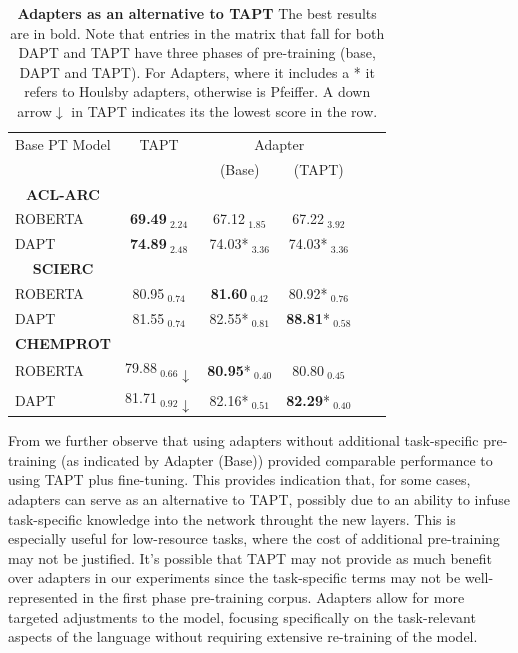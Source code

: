 \documentclass[10pt,twocolumn,letterpaper]{article}
\begin{document}
\begin{table}[H]
    \centering
    \begin{tabular}{@{}lccccc@{}}
    \hline
    Base PT Model & TAPT & \multicolumn{2}{c}{Adapter} \\
    \cmidrule(lr){2-2} \cmidrule(lr){3-4}
    & & (Base) & (TAPT) \\
    \multicolumn{1}{c}{\textbf{ACL-ARC}} \\
    ROBERTA & \textbf{69.49}$_{\text{ 2.24}}$ & 67.12$_{\text{ 1.85}}$ & 67.22$_{\text{ 3.92}}$ \\
     DAPT & \textbf{74.89}$_{\text{ 2.48}}$ & 74.03*$_{\text{ 3.36}}$ & 74.03*$_{\text{ 3.36}}$ \\
    \hline
    \multicolumn{1}{c}{\textbf{SCIERC}}\\
    ROBERTA & 80.95$_{\text{ 0.74}}$ & \textbf{81.60}$_{\text{ 0.42}}$ & 80.92*$_{\text{ 0.76}}$ \\
    DAPT & 81.55$_{\text{ 0.74}}$ & 82.55*$_{\text{ 0.81}}$ & \textbf{88.81}*$_{\text{ 0.58}}$ \\
    \hline
    \multicolumn{1}{c}{\textbf{CHEMPROT}}\\
    ROBERTA & 79.88$_{\text{ 0.66}}\downarrow$ & \textbf{80.95}*$_{\text{ 0.40}}$ & 80.80$_{\text{ 0.45}}$ \\
    DAPT & 81.71$_{\text{ 0.92}}\downarrow$ & 82.16*$_{\text{ 0.51}}$ & \textbf{82.29}*$_{\text{ 0.40}}$ \\
\end{tabular}
\caption{\textbf{Adapters as an alternative to TAPT} The best results are in bold. Note that entries in the matrix that fall for both DAPT and TAPT have three phases of pre-training (base, DAPT and TAPT). For Adapters, where it includes a * it refers to Houlsby adapters, otherwise is Pfeiffer. A down arrow$\downarrow$ in TAPT indicates its the lowest score in the row.}
\label{table:adapters_vs_tapt}
\end{table}

From  we further observe that using adapters without additional task-specific pre-training (as indicated by Adapter (Base)) provided comparable performance to using TAPT plus fine-tuning. This provides indication that, for some cases, adapters can serve as an alternative to TAPT, possibly due to an ability to infuse task-specific knowledge into the network throught the new layers. This is especially useful for low-resource tasks, where the cost of additional pre-training may not be justified. It's possible that TAPT may not provide as much benefit over adapters in our experiments since the task-specific terms may not be well-represented in the first phase pre-training corpus. Adapters allow for more targeted adjustments to the model, focusing specifically on the task-relevant aspects of the language without requiring extensive re-training of the model.
\end{document}
